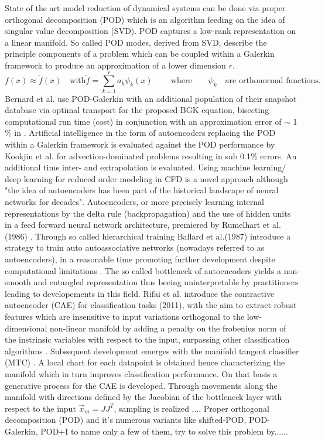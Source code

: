 State of the art model reduction of dynamical systems can be done via proper orthogonal decomposition (POD) which is an algorithm feeding on the idea of singular value decomposition (SVD)\cite{Franz}\cite{Kutz}. POD captures a low-rank representation on a linear manifold. So called POD modes, derived from SVD, describe the principle components of a problem which can be coupled within a Galerkin framework to produce an approximation of a lower dimension \(r\). 
\begin{equation}
f(x)\approx \tilde{f}(x) \quad\textrm{with}\tilde{f}=\sum_{k=1}^r a_k \psi_k(x)  \qquad\ \textrm{where}\qquad \psi_k\quad \textrm{are orthonormal functions.}
\end{equation}
Bernard et al. use POD-Galerkin with an additional population of their snapshot database via optimal transport for the proposed BGK equation, bisecting computational run time (cost) in conjunction with an approximation error of \(\sim\) 1 \% in \cite{Bernard}. Artificial intelligence in the form of autoencoders replacing the POD within a Galerkin framework is evaluated against the POD performance by Kookjin et al. for advection-dominated problems\cite{Carlberg} resulting in sub 0.1\% errors. An additional time inter- and extrapolation is evaluated. Using machine learning/ deep learning for reduced order modeling in CFD is a novel approach although "the idea of autoencoders has been part of the historical landscape of neural networks for decades"\cite[p.493]{Goodfellow}. Autoencoders, or more precisely learning internal representations by the delta rule (backpropagation) and the use of hidden units in a feed forward neural network architecture, premiered by Rumelhart et al. (1986) \cite{Rumelhart}.  Through so called hierarchical training Ballard et al.(1987) introduce a strategy to train auto autoassociative networks (nowadays referred to as autoencoders), in a reasonable time promoting further development despite computational limitations \cite{Ballard}. The so called bottleneck of autoencoders yields a non-smooth and entangled representation thus beeing uninterpretable by practitioners\cite{Rifai2011} leading to developements in this field. Rifai et al. introduce the contractive autoencoder (CAE) for classification tasks (2011), with the aim to extract robust features which are insensitive to input variations orthogonal to the low-dimensional non-linear manifold by adding a penalty on the frobenius norm of the instrinsic variables with respect to the input, surpassing other classification algorithms \cite{Rifai2011}. Subsequent development emerges with the manifold tangent classifier (MTC) \cite{Rifai_2011a}. A local chart for each datapoint is obtained hence characterizing the manifold  which in turn improves classification performance. On that basis a generative process for the CAE is developed. Through movements along the manifold with directions defined by the Jacobian of the bottleneck layer with respect to the input \begin{math}	\vec{x}_m=JJ^T \end{math}, sampling is realized \cite{rifai2012generative}....
Proper orthogonal decomposition (POD) and it's numerous variants like shifted-POD\cite{bibid}, POD-Galerkin\cite{bibid}, POD+I \cite{bibid} to name only a few of them, try to solve this problem by......